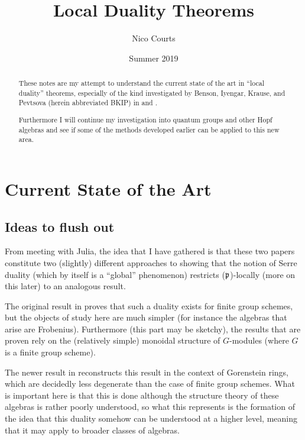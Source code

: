 \documentclass[12pt]{article}
\begin{document}
\title{Local Duality Theorems \vspace{-1ex}}
\author{Nico Courts}
\date{Summer 2019}
\maketitle

\renewcommand{\abstractname}{Introduction}
\begin{abstract}
	These notes are my attempt to understand the current state of the art in ``local duality'' theorems, especially 
	of the kind investigated by Benson, Iyengar, Krause, and Pevtsova (herein abbreviated BKIP) in \cite{BIKPgroupschemes} and \cite{BKIPgorenstein}.

	Furthermore I will continue my investigation into quantum groups and other Hopf algebras and see if some of the methods developed earlier 
	can be applied to this new area.
\end{abstract}

\section{Current State of the Art}
\subsection{Ideas to flush out}
From meeting with Julia, the idea that I have gathered is that these two papers constitute two (slightly) different approaches 
to showing that the notion of Serre duality (which by itself is a ``global'' phenomenon) restricts ($\mathfrak{p}$)-locally (more on this later)
to an analogous result.

The original result in \cite{BIKPgroupschemes} proves that such a duality exists for finite group schemes, but the objects of study here are 
much simpler (for instance the algebras that arise are Frobenius). Furthermore (this part may be sketchy), the results that are proven 
rely on the (relatively simple) monoidal structure of $G$-modules (where $G$ is a finite group scheme). 

The newer result in \cite{BKIPgorenstein} reconstructs this result in the context of Gorenstein rings, which are decidedly less degenerate than 
the case of finite group schemes. What is important here is that this is done although the structure theory of these algebras 
is rather poorly understood, so what this represents is the formation of the idea that this duality somehow can be understood at
a higher level, meaning that it may apply to broader classes of algebras.
\end{document}
